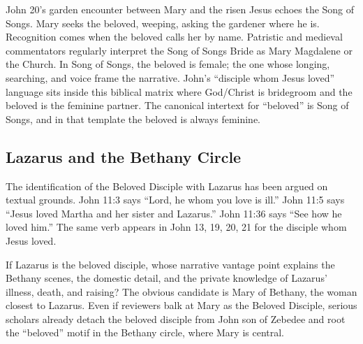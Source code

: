 John 20's garden encounter between Mary and the risen Jesus echoes the Song of Songs.
Mary seeks the beloved, weeping, asking the gardener where he is.
Recognition comes when the beloved calls her by name.
Patristic and medieval commentators regularly interpret the Song of Songs Bride as Mary Magdalene or the Church.
In Song of Songs, the beloved is female; the one whose longing, searching, and voice frame the narrative.
John's ``disciple whom Jesus loved'' language sits inside this biblical matrix where God/Christ is bridegroom and the beloved is the feminine partner.
The canonical intertext for ``beloved'' is Song of Songs, and in that template the beloved is always feminine.

\subsection{Lazarus and the Bethany Circle}\label{subsec:lazarus-bethany}

The identification of the Beloved Disciple with Lazarus has been argued on textual grounds.
John 11:3 says ``Lord, he whom you love is ill.''
John 11:5 says ``Jesus loved Martha and her sister and Lazarus.''
John 11:36 says ``See how he loved him.''
The same verb appears in John 13, 19, 20, 21 for the disciple whom Jesus loved.

If Lazarus is the beloved disciple, whose narrative vantage point explains the Bethany scenes, the domestic detail, and the private knowledge of Lazarus' illness, death, and raising?
The obvious candidate is Mary of Bethany, the woman closest to Lazarus.
Even if reviewers balk at Mary as the Beloved Disciple, serious scholars already detach the beloved disciple from John son of Zebedee and root the ``beloved'' motif in the Bethany circle, where Mary is central.

